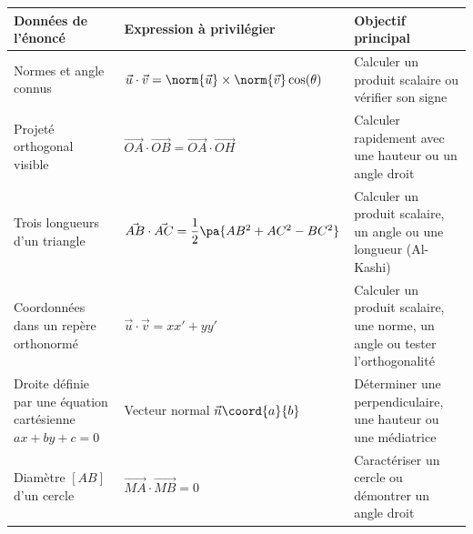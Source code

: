 \begin{center}
	\begin{tabular}{|>{\raggedright\arraybackslash}m{4.8cm}|>{\raggedright\arraybackslash}m{5.6cm}|>{\raggedright\arraybackslash}m{5.2cm}|} \hline
		\ccg \textbf{Données de l'énoncé}                             & \ccg \textbf{Expression à privilégier}                                   & \ccg \textbf{Objectif principal}                                            \\ \hline
		Normes et angle connus                                        & $\vec{u} \cdot \vec{v} = \norm{\vec{u}}\times\norm{\vec{v}}\cos(\theta)$ & Calculer un produit scalaire ou vérifier son signe                          \\ \hline
		Projeté orthogonal visible                                    & $\vec{OA} \cdot \vec{OB} = \vec{OA} \cdot \vec{OH}$                      & Calculer rapidement avec une hauteur ou un angle droit                      \\ \hline
		Trois longueurs d'un triangle                                 & $\vec{AB} \cdot \vec{AC} = \dfrac{1}{2}\pa{AB^2 + AC^2 - BC^2}$          & Calculer un produit scalaire, un angle ou une longueur (Al-Kashi)           \\ \hline
		Coordonnées dans un repère orthonormé                         & $\vec{u} \cdot \vec{v} = xx' + yy'$                                      & Calculer un produit scalaire, une norme, un angle ou tester l'orthogonalité \\ \hline
		Droite définie par une équation cartésienne $ax + by + c = 0$ & Vecteur normal $\def\arraystretch{0.9}\vec{n}\coord{a}{b}$               & Déterminer une perpendiculaire, une hauteur ou une médiatrice               \\ \hline
		Diamètre $[AB]$ d'un cercle                                   & $\vec{MA} \cdot \vec{MB} = 0$                                            & Caractériser un cercle ou démontrer un angle droit                          \\ \hline
	\end{tabular}
\end{center}

